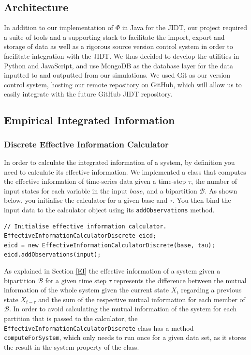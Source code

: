 \documentclass[a4paper,11pt]{article}
\begin{document}
\subsection{Architecture}

In addition to our implementation of $\Phi$ in Java for the JIDT, our project required a suite of tools and a supporting stack to facilitate the import, export and storage of data as well as a rigorous source version control system in order to facilitate integration with the JIDT. We thus decided to develop the utilities in Python and JavaScript, and use MongoDB as the database layer for the data inputted to and outputted from our simulations. We used Git as our version control system, hosting our remote repository on \href{http://github.com}{GitHub}, which will allow us to easily integrate with the future GitHub JIDT repository.

\subsection{Empirical Integrated Information}
\label{sec:impl:phi-e}

\subsubsection{Discrete Effective Information Calculator}
\label{sec:impl:ei}

In order to calculate the integrated information of a system, by definition you need to calculate its effective information. We implemented a class that computes the effective information of time-series data given a time-step $\tau$, the number of input states for each variable in the input $base$, and a bipartition $\mathcal{B}$. As shown below, you initialise the calculator for a given base and $\tau$. You then bind the input data to the calculator object using its \texttt{addObservations} method.

\begin{verbatim}
// Initialise effective information calculator.
EffectiveInformationCalculatorDiscrete eicd;
eicd = new EffectiveInformationCalculatorDiscrete(base, tau);
eicd.addObservations(input);
\end{verbatim}

As explained in Section \ref{EI} the effective information of a system given a bipartition $\mathcal{B}$ for a given time step $\tau$ represents the difference between the mutual information of the whole system given the current state $X_t$ regarding a previous state $X_{t-\tau}$ and the sum of the respective mutual information for each member of $\mathcal{B}$. In order to avoid calculating the mutual information of the system for each partition that is passed to the calculator, the \texttt{EffectiveInformationCalculatorDiscrete} class has a method \texttt{computeForSystem}, which only needs to run once for a given data set, as it stores the result in the system property of the class.
\end{document}
